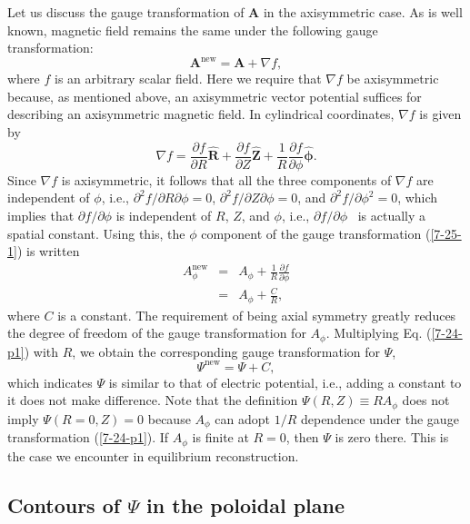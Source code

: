 \documentclass{llncs}
\newcommand{\tmmathbf}[1]{\ensuremath{\boldsymbol{#1}}}
\newcommand{\tmop}[1]{\ensuremath{\operatorname{#1}}}
\begin{document}
Let us discuss the gauge transformation of $\mathbf{A}$ in the axisymmetric
case. As is well known, magnetic field remains the same under the following
gauge transformation:
\begin{equation}
  \label{7-25-1} \mathbf{A}^{\tmop{new}} =\mathbf{A}+ \nabla f,
\end{equation}
where $f$ is an arbitrary scalar field. Here we require that $\nabla f$ be
axisymmetric because, as mentioned above, an axisymmetric vector potential
suffices for describing an axisymmetric magnetic field. In cylindrical
coordinates, $\nabla f$ is given by
\begin{equation}
  \nabla f = \frac{\partial f}{\partial R} \hat{\mathbf{R}} + \frac{\partial
  f}{\partial Z} \hat{\mathbf{Z}} + \frac{1}{R}  \frac{\partial f}{\partial
  \phi} \hat{\tmmathbf{\phi}} .
\end{equation}
Since $\nabla f$ is axisymmetric, it follows that all the three components of
$\nabla f$ are independent of $\phi$, i.e., $\partial^2 f / \partial R
\partial \phi = 0$, $\partial^2 f / \partial Z \partial \phi = 0$, and
$\partial^2 f / \partial \phi^2 = 0$, which implies that $\partial f /
\partial \phi$ is independent of $R$, $Z$, and $\phi$, i.e., $\partial f /
\partial \phi$ \ is actually a spatial constant. Using this, the $\phi$
component of the gauge transformation (\ref{7-25-1}) is written
\begin{eqnarray}
  A_{\phi}^{\tmop{new}} & = & A_{\phi} + \frac{1}{R}  \frac{\partial
  f}{\partial \phi} \nonumber\\
  & = & A_{\phi} + \frac{C}{R},  \label{7-24-p1}
\end{eqnarray}
where $C$ is a constant. The requirement of being axial symmetry greatly
reduces the degree of freedom of the gauge transformation for $A_{\phi}$.
Multiplying Eq. (\ref{7-24-p1}) with $R$, we obtain the corresponding gauge
transformation for $\Psi$,
\begin{equation}
  \label{7-24-p3} \Psi^{\tmop{new}} = \Psi + C,
\end{equation}
which indicates $\Psi$ is similar to that of electric potential, i.e., adding
a constant to it does not make difference. Note that the definition $\Psi (R,
Z) \equiv R A_{\phi}$ does not imply $\Psi (R = 0, Z) = 0$ because $A_{\phi}$
can adopt $1 / R$ dependence under the gauge transformation (\ref{7-24-p1}).
If $A_{\phi}$ is finite at $R = 0$, then $\Psi$ is zero there. This is the
case we encounter in equilibrium reconstruction.

\subsection{Contours of $\Psi$ in the poloidal plane}\label{20-5-8-p1}
\end{document}
